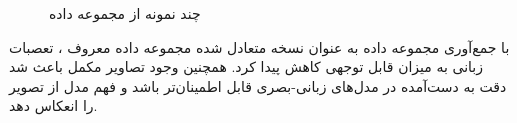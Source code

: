 \begin{figure}[H]
	\caption{چند نمونه از مجموعه داده  
	 \cite{balanced_vqa_v2}}
	\label{VQA_V2}
\end{figure}

با جمع‌آوری مجموعه داده
به عنوان نسخه متعادل شده مجموعه داده معروف
، تعصبات زبانی به میزان قابل توجهی کاهش پیدا کرد. همچنین وجود تصاویر مکمل باعث شد دقت به دست‌آمده در مدل‌های زبانی-بصری  قابل اطمینان‌تر باشد و فهم مدل از تصویر را انعکاس دهد.

